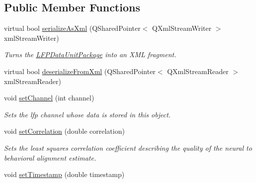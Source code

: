 \subsection*{Public Member Functions}
\begin{DoxyCompactItemize}
\item 
virtual bool \hyperlink{class_picto_1_1_l_f_p_data_unit_package_aad789aa516839dbf5f776a99f56a2ffc}{serialize\-As\-Xml} (Q\-Shared\-Pointer$<$ Q\-Xml\-Stream\-Writer $>$ xml\-Stream\-Writer)
\begin{DoxyCompactList}\small\item\em Turns the \hyperlink{class_picto_1_1_l_f_p_data_unit_package}{L\-F\-P\-Data\-Unit\-Package} into an X\-M\-L fragment. \end{DoxyCompactList}\item 
virtual bool \hyperlink{class_picto_1_1_l_f_p_data_unit_package_afd1d375a397894919fa7d60a60109628}{deserialize\-From\-Xml} (Q\-Shared\-Pointer$<$ Q\-Xml\-Stream\-Reader $>$ xml\-Stream\-Reader)
\item 
\hypertarget{class_picto_1_1_l_f_p_data_unit_package_a516ee42b3d1326b2cedbad677172e0c6}{void \hyperlink{class_picto_1_1_l_f_p_data_unit_package_a516ee42b3d1326b2cedbad677172e0c6}{set\-Channel} (int channel)}\label{class_picto_1_1_l_f_p_data_unit_package_a516ee42b3d1326b2cedbad677172e0c6}

\begin{DoxyCompactList}\small\item\em Sets the lfp channel whose data is stored in this object. \end{DoxyCompactList}\item 
\hypertarget{class_picto_1_1_l_f_p_data_unit_package_aa6e11f4c9060c9472dc55f1615be5ed6}{void \hyperlink{class_picto_1_1_l_f_p_data_unit_package_aa6e11f4c9060c9472dc55f1615be5ed6}{set\-Correlation} (double correlation)}\label{class_picto_1_1_l_f_p_data_unit_package_aa6e11f4c9060c9472dc55f1615be5ed6}

\begin{DoxyCompactList}\small\item\em Sets the least squares correlation coefficient describing the quality of the neural to behavioral alignment estimate. \end{DoxyCompactList}\item 
\hypertarget{class_picto_1_1_l_f_p_data_unit_package_af5678131801d5a57a2a39ea62dc14832}{void \hyperlink{class_picto_1_1_l_f_p_data_unit_package_af5678131801d5a57a2a39ea62dc14832}{set\-Timestamp} (double timestamp)}\label{class_picto_1_1_l_f_p_data_unit_package_af5678131801d5a57a2a39ea62dc14832}


\end{DoxyCompactItemize}
